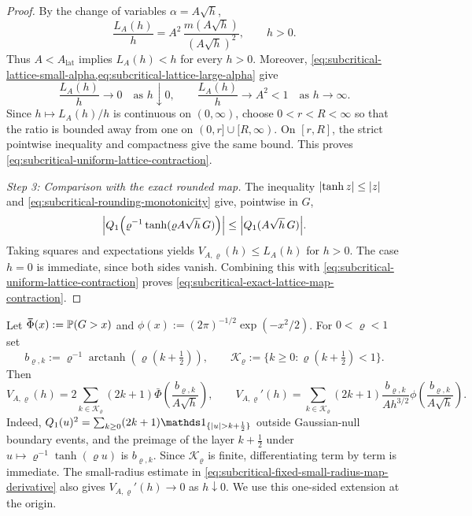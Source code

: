 \documentclass[11pt,reqno,a4paper]{article}
\newcommand{\Pp}{\P}
\DeclareMathOperator{\arctanh}{arctanh}
\begin{document}
\begin{proof}
  By the change of variables $\alpha=A\sqrt h$,
  \begin{equation*}
    \frac{L_A(h)}h
    =
    A^2\,\frac{m(A\sqrt h)}{(A\sqrt h)^2},
    \qquad h>0 .
  \end{equation*}
  Thus $A<A_{\mathrm{lat}}$ implies $L_A(h)<h$ for every $h>0$.
  Moreover,
  \cref{eq:subcritical-lattice-small-alpha,eq:subcritical-lattice-large-alpha}
  give
  \begin{equation*}
    \frac{L_A(h)}h\to0
    \quad\mbox{as }h\downarrow0,
    \qquad
    \frac{L_A(h)}h\to A^2<1
    \quad\mbox{as }h\to\infty .
  \end{equation*}
  Since $h\mapsto L_A(h)/h$ is continuous on $(0,\infty)$, choose
  $0<r<R<\infty$ so that the ratio is bounded away from one on
  $(0,r]\cup[R,\infty)$. On $[r,R]$, the strict pointwise inequality and
  compactness give the same bound. This proves
  \cref{eq:subcritical-uniform-lattice-contraction}.

  \emph{Step 3: Comparison with the exact rounded map.}
  The inequality $\abs{\tanh z}\leq\abs z$ and
  \cref{eq:subcritical-rounding-monotonicity} give, pointwise in $G$,
  \begin{equation*}
    \left|
      Q_1\left(
        \varrho^{-1}\tanh(\varrho A\sqrt h\,G)
      \right)
    \right|
    \leq
    \abs{Q_1(A\sqrt h\,G)} .
  \end{equation*}
  Taking squares and expectations yields
  $V_{A,\varrho}(h)\leq L_A(h)$ for $h>0$. The case $h=0$ is immediate,
  since both sides vanish. Combining this with
  \cref{eq:subcritical-uniform-lattice-contraction} proves
  \cref{eq:subcritical-exact-lattice-map-contraction}.
\end{proof}

Let
$\bar\Phi(x):=\Pp(G>x)$ and
$\phi(x):=(2\pi)^{-1/2}\exp(-x^2/2)$. For $0<\varrho<1$ set
\begin{equation}\label{eq:subcritical-layer-thresholds}
  b_{\varrho,k}
  :=
  \varrho^{-1}\arctanh\left(\varrho(k+\tfrac12)\right),
  \qquad
  \mathcal K_\varrho
  :=
  \{k\geq0:\varrho(k+\tfrac12)<1\}.
\end{equation}
Then
\begin{equation}\label{eq:subcritical-layer-formulas-exact}
  V_{A,\varrho}(h)=2\sum_{k\in\mathcal K_\varrho}(2k+1)
  \bar\Phi\left(\frac{b_{\varrho,k}}{A\sqrt h}\right),
  \qquad
  V_{A,\varrho}'(h)=\sum_{k\in\mathcal K_\varrho}(2k+1)
  \frac{b_{\varrho,k}}{Ah^{3/2}}
  \phi\left(\frac{b_{\varrho,k}}{A\sqrt h}\right).
\end{equation}
Indeed, $Q_1(u)^2=\sum_{k\geq0}(2k+1)
\one_{\{\abs u>k+\frac12\}}$ outside Gaussian-null boundary events, and the
preimage of the layer $k+\frac12$ under
$u\mapsto\varrho^{-1}\tanh(\varrho u)$ is $b_{\varrho,k}$. Since
$\mathcal K_\varrho$ is finite, differentiating term by term is immediate.
The small-radius estimate in
\cref{eq:subcritical-fixed-small-radius-map-derivative} also gives
$V_{A,\varrho}'(h)\to0$ as $h\downarrow0$. We use this one-sided extension at
the origin.
\end{document}
